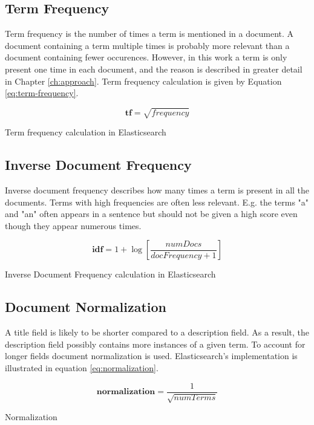 \subsection{Term Frequency}
Term frequency is the number of times a term is mentioned in a document.
A document containing a term multiple times is probably more relevant than a document containing fewer occurences.
However, in this work a term is only present one time in each document, and the reason is described in greater detail in Chapter \ref{ch:approach}.
Term frequency calculation is given by Equation \ref{eq:term-frequency}.

\begin{cequation}[H]
	\begin{equation}
		\mathbf{tf} = \sqrt{frequency}
	\end{equation}
	\caption{Term frequency calculation in Elasticsearch}
  \label{eq:term-frequency}
\end{cequation}

\subsection{Inverse Document Frequency}
Inverse document frequency describes how many times a term is present in all the documents.
Terms with high frequencies are often less relevant.
E.g. the terms "a" and "an" often appears in a sentence but should not be given a high score even though they appear numerous times.

\begin{cequation}[H]
	\begin{equation}
		\mathbf{idf} = 1 + \log{[\frac{numDocs}{docFrequency + 1}]}
	\end{equation}
	\caption{Inverse Document Frequency calculation in Elasticsearch}
  \label{eq:idf}
\end{cequation}

\subsection{Document Normalization}
A title field is likely to be shorter compared to a description field.
As a result, the description field possibly contains more instances of a given term.
To account for longer fields document normalization is used.
Elasticsearch's implementation is illustrated in equation \ref{eq:normalization}.

\begin{cequation}[H]
	\begin{equation}
		\mathbf{normalization} = \frac{1}{\sqrt{numTerms}}
	\end{equation}
	\caption{Normalization}
  \label{eq:normalization}
\end{cequation}

